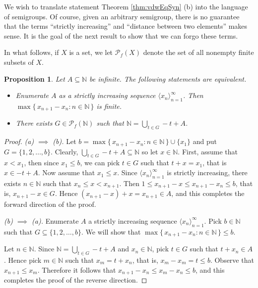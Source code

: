 \documentclass[12pt]{article}
\theoremstyle{plain}
\newtheorem{prop}[thm]{Proposition}
\theoremstyle{definition}
\newcommand{\la}{\langle}
\newcommand{\ra}{\rangle}
\newcommand{\bbN}{\mathbb{N}}
\newcommand{\Pf}{\mathcal{P}_f}
\begin{document}
We wish to translate statement Theorem \ref{thm:vdwEqSyn} (b) into
the language of semigroups.
Of course, given an arbitrary semigroup, there is no guarantee that 
the terms ``strictly increasing'' and ``distance between two
elements'' makes sense.
It is the goal of the next result to show that we can forgo these
terms.

In what follows, if $X$ is a set, we let $\Pf(X)$ denote the set of
all nonempty finite subsets of $X$. 

\begin{prop}
  \label{prop:syn}
  Let $A \subseteq \bbN$ be infinite.
  The following statements are equivalent.
  \begin{itemize}
    \item[(a)] Enumerate $A$ as a strictly increasing sequence $\la
      x_n \ra_{n=1}^\infty$.
      Then $\max\{\, x_{n+1} - x_n : n \in \bbN \,\}$ is finite.

    \item[(b)] There exists $G \in \Pf(\bbN)$ such that $\bbN =
      \bigcup_{t \in G} -t + A$. 
  \end{itemize}
\end{prop}
\begin{proof}
  \textsl{(a) $\implies$ (b).}
  Let $b = \max\{\, x_{n+1} - x_n : n \in \bbN \,\} \cup \{x_1\}$ and
  put $G = \{1, 2, \ldots, b\}$. 
  Clearly, $\bigcup_{t \in G} -t + A \subseteq \bbN$ so let $x \in
  \bbN$. 
  First, assume that $x < x_1$, then since $x_1 \le b$, we can pick $t
  \in G$ such that $t + x = x_1$, that is $x \in -t + A$.
  Now assume that $x_1 \le x$.
  Since $\la x_n \ra_{n=1}^\infty$ is strictly increasing, there
  exists $n \in \bbN$ such that $x_n \le x < x_{n+1}$.  
  Then $1 \le x_{n+1} - x \le x_{n+1} - x_n \le b$, that is, $x_{n+1}
  - x \in G$.
  Hence $(x_{n+1} - x) + x = x_{n+1} \in A$, and this completes the
  forward direction of the proof.

  \textsl{(b) $\implies$ (a).}
  Enumerate $A$ a strictly increasing sequence $\la x_n
  \ra_{n=1}^\infty$. 
  Pick $b \in \bbN$ such that $G \subseteq \{1, 2, \ldots, b\}$.
  We will show that $\max\{\, x_{n+1} - x_n : n \in \bbN \,\} \le b$. 

  Let $n \in \bbN$.
  Since $\bbN = \bigcup_{t \in G} -t+A$ and $x_n \in \bbN$, pick $t
  \in G$ such that $t + x_n \in A$.
  Hence pick $m \in \bbN$ such that $x_m = t + x_n$, that is, $x_m -
  x_m = t \le b$. 
  Observe that $x_{n+1} \le x_m$.
  Therefore it follows that $x_{n+1} - x_n \le x_m - x_n \le b$, and 
  this completes the proof of the reverse direction.
\end{proof}
\end{document}
